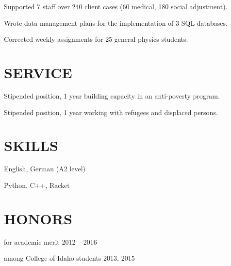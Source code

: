 \documentclass[margin]{res}
\begin{document}
\begin{resume}
\begin{details}
\item{Supported 7 staff over 240 client cases (60 medical, 180 social adjustment).}
\item{Wrote data management plans for the implementation of 3 SQL databases.}
\end{details}

\begin{details}
\item{Corrected weekly assignments for 25 general physics students.}
\end{details} 

\section{SERVICE}

\begin{details}
\item{Stipended position, 1 year building capacity in an anti-poverty program.}
\end{details}

\begin{details}
\item{Stipended position, 1 year working with refugees and displaced persons.}
\end{details}

\section{SKILLS}
\vspace{0pt}
\begin{multicols}{2} \parskip=0pt
\begin{details}
\item English, German (A2 level)
\end{details}
\begin{details}
\item Python, C++, Racket
\end{details}
\end{multicols}

\section{HONORS} \vspace{10pt}

\begin{description}[noitemsep,topsep=0pt]
\item[Heritage Scholarship] for academic merit \hfill 2012 -- 2016
\item[Top Putnam Score] among College of Idaho students \hfill 2013, 2015
\end{description}

\end{resume}
\end{document}
